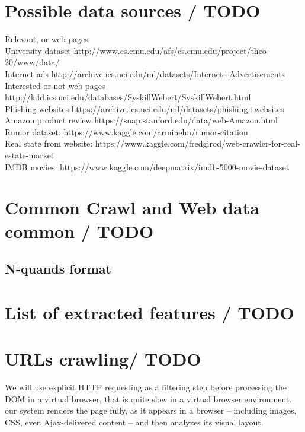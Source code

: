 \section{Possible data sources / TODO}

Relevant, or web pages\\
University dataset http://www.cs.cmu.edu/afs/cs.cmu.edu/project/theo-20/www/data/\\
Internet ads http://archive.ics.uci.edu/ml/datasets/Internet+Advertisements\\
Interested or not web pages http://kdd.ics.uci.edu/databases/SyskillWebert/SyskillWebert.html\\
Phishing websites https://archive.ics.uci.edu/ml/datasets/phishing+websites\\
Amazon product review https://snap.stanford.edu/data/web-Amazon.html\\
Rumor dataset: https://www.kaggle.com/arminehn/rumor-citation\\
Real state from website: https://www.kaggle.com/fredgirod/web-crawler-for-real-estate-market\\
IMDB movies: https://www.kaggle.com/deepmatrix/imdb-5000-movie-dataset\\



\label{sec:datasource}
\section{Common Crawl and Web data common / TODO}
\subsection{N-quands format}
\label{subsec:nquand}
\section{List of extracted features / TODO}
\label{sec:features}
\section{URLs crawling/ TODO}
\label{sec:urlparse}
We will use explicit HTTP requesting as a filtering step before processing the DOM in a virtual browser, that is quite slow in a virtual browser environment. \\

our system renders the page fully, as it appears in a browser -- including images, CSS, even Ajax-delivered content -- and then analyzes its visual layout.